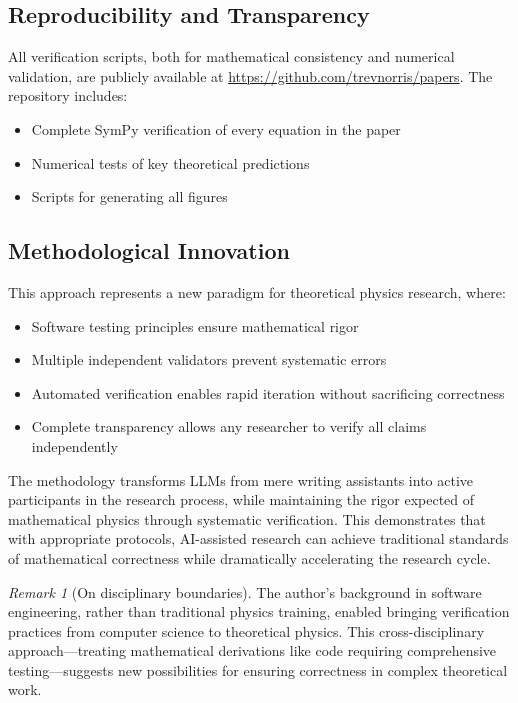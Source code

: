 \documentclass[11pt]{article}
\theoremstyle{remark}
\newtheorem{remark}{Remark}
\theoremstyle{definition}
\begin{document}
\subsection{Reproducibility and Transparency}
All verification scripts, both for mathematical consistency and numerical validation, are publicly available at \url{https://github.com/trevnorris/papers}. The repository includes:
\begin{itemize}
\item Complete SymPy verification of every equation in the paper
\item Numerical tests of key theoretical predictions
\item Scripts for generating all figures
\end{itemize}

\subsection{Methodological Innovation}
This approach represents a new paradigm for theoretical physics research, where:
\begin{itemize}
\item Software testing principles ensure mathematical rigor
\item Multiple independent validators prevent systematic errors
\item Automated verification enables rapid iteration without sacrificing correctness
\item Complete transparency allows any researcher to verify all claims independently
\end{itemize}

The methodology transforms LLMs from mere writing assistants into active participants in the research process, while maintaining the rigor expected of mathematical physics through systematic verification. This demonstrates that with appropriate protocols, AI-assisted research can achieve traditional standards of mathematical correctness while dramatically accelerating the research cycle.

\begin{remark}[On disciplinary boundaries]
The author's background in software engineering, rather than traditional physics training, enabled bringing verification practices from computer science to theoretical physics. This cross-disciplinary approach—treating mathematical derivations like code requiring comprehensive testing—suggests new possibilities for ensuring correctness in complex theoretical work.
\end{remark}
\end{document}
